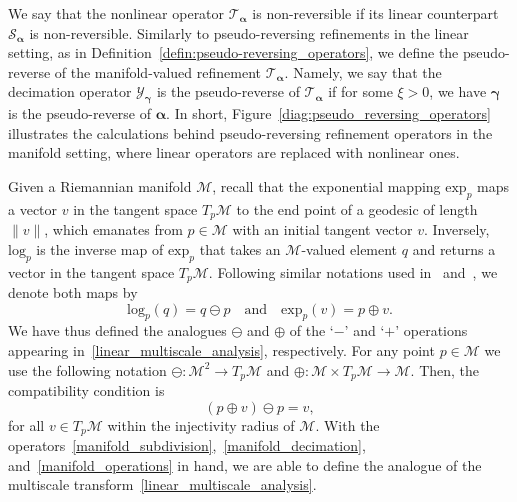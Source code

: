 \documentclass[12pt]{article}
\begin{document}
We say that the nonlinear operator $\mathcal{T}_{\boldsymbol{\alpha}}$ is non-reversible if its linear counterpart $\mathcal{S}_{\boldsymbol{\alpha}}$ is non-reversible. Similarly to pseudo-reversing refinements in the linear setting, as in Definition~\ref{defin:pseudo-reversing_operators}, we define the pseudo-reverse of the manifold-valued refinement $\mathcal{T}_{\boldsymbol{\alpha}}$. Namely, we say that the decimation operator $\mathcal{Y}_{\boldsymbol{\gamma}}$ is the pseudo-reverse of $\mathcal{T}_{\boldsymbol{\alpha}}$ if for some $\xi>0$, we have $\boldsymbol{\gamma}$ is the pseudo-reverse of $\boldsymbol{\alpha}$. In short, Figure~\ref{diag:pseudo_reversing_operators} illustrates the calculations behind pseudo-reversing refinement operators in the manifold setting, where linear operators are replaced with nonlinear ones.

Given a Riemannian manifold $\mathcal{M}$, recall that the exponential mapping $\text{exp}_p$ maps a vector $v$ in the tangent space $T_p\mathcal{M}$ to the end point of a geodesic of length $\|v\|$, which emanates from $p\in\mathcal{M}$ with an initial tangent vector $v$. Inversely, $\text{log}_p$ is the inverse map of $\text{exp}_p$ that takes an $\mathcal{M}$-valued element $q$ and returns a vector in the tangent space $T_p\mathcal{M}$. Following similar notations used in~\cite{grohs2009interpolatory} and~\cite{mattar2023pyramid}, we denote both maps by
\begin{equation}\label{manifold_operations}
    \text{log}_p(q)=q\ominus p\quad \text{and} \quad \text{exp}_p(v)=p\oplus v.
\end{equation}
We have thus defined the analogues $\ominus$ and $\oplus$ of the `$-$' and `$+$' operations appearing in~\eqref{linear_multiscale_analysis}, respectively. For any point $p\in\mathcal{M}$ we use the following notation $\ominus:\mathcal{M}^2\rightarrow T_p\mathcal{M}$ and $\oplus:\mathcal{M}\times T_p\mathcal{M}\rightarrow\mathcal{M}$. Then, the compatibility condition is
\begin{equation*}
    (p \oplus v) \ominus p = v,
\end{equation*}
for all $v\in T_p\mathcal{M}$ within the injectivity radius of $\mathcal{M}$. With the operators~\eqref{manifold_subdivision},~\eqref{manifold_decimation}, and~\eqref{manifold_operations} in hand, we are able to define the analogue of the multiscale transform~\eqref{linear_multiscale_analysis}.
\end{document}

